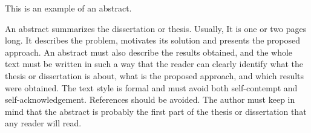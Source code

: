 This is an example of an abstract.

An abstract summarizes the dissertation or thesis. Usually, It is one or two pages long. It describes the problem, motivates its solution and presents the proposed approach. An abstract must also describe the results obtained, and the whole text must be written in such a way that the reader can clearly identify what the thesis or dissertation is about, what is the proposed approach, and which results were obtained. The text style is formal and must avoid both self-contempt and self-acknowledgement. References should be avoided. The author must keep in mind that the abstract is probably the first part of the thesis or dissertation that any reader will read.
